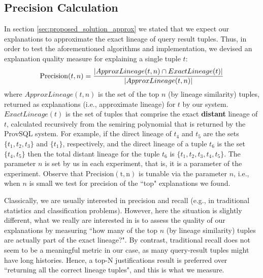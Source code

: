 \subsection{Precision Calculation} In section \ref{sec:proposed_solution_approx} we stated that we expect our explanations to approximate the exact lineage of query result tuples. 
Thus, in order to test the aforementioned algorithms and implementation, we devised an explanation quality measure for explaining a single tuple $t$: 
\begin{equation*}
    \operatorname{Precision}(t, n) = \frac{|ApproxLineage(t, n) \cap ExactLineage(t)|}{|ApproxLineage(t, n)|}\\
\end{equation*}
where $ApproxLineage(t, n)$ is the set of the top $n$ (by lineage similarity) tuples, returned as explanations (i.e., approximate lineage) for $t$ by our system. $ExactLineage(t)$ is the set of tuples that comprise the exact \textbf{distant} lineage of $t$, calculated recursively from the semiring polynomial that is returned by the ProvSQL system.
For example, if the direct lineage of $t_4$ and $t_5$ are the sets $\{t_1, t_2, t_3\}$ and $\{t_1\}$, respectively, and the direct lineage of a tuple $t_6$ is the set $\{t_4, t_5\}$ then the total distant lineage for the tuple $t_6$ is $\{t_1, t_2, t_3, t_4, t_5\}$.
The parameter $n$ is set by us in each experiment, that is, it is a parameter of the experiment. 
Observe that $\operatorname{Precision(t, n)}$ is tunable via the parameter $n$, i.e., when $n$ is small we test for precision of the ``top" explanations we found.\\
\par Classically, we are usually interested in precision and recall (e.g., in traditional statistics and classification problems). However, here the situation is slightly different, what we really are interested in is to assess the quality of our explanations by measuring ``how many of the top $n$ (by lineage similarity) tuples are actually part of the exact lineage?". By contrast, traditional recall does not seem to be a meaningful metric in our case, as many query-result tuples might have long histories. Hence, a top-N justifications result is preferred over ``returning all the correct lineage tuples", and this is what we measure.

